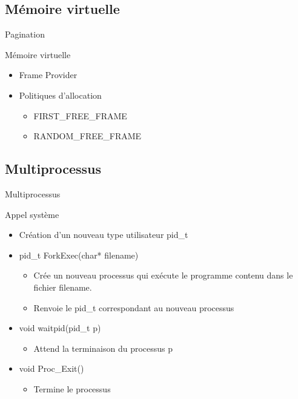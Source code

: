 \documentclass{beamer}
\begin{document}
\subsection{Mémoire virtuelle}
\begin{frame}{Pagination}
	\begin{block}{Mémoire virtuelle}
		\begin{itemize}[<+->]
			\item Frame Provider
			\item Politiques d'allocation
			\begin{itemize}
				\item FIRST\_FREE\_FRAME
				\item RANDOM\_FREE\_FRAME			
			\end{itemize}
		\end{itemize}
	\end{block}
\end{frame}
\subsection{Multiprocessus}

\begin{frame}{Multiprocessus}
	\begin{block}{Appel système}
		\begin{itemize}[<+->]
			\item Création d'un nouveau type utilisateur pid\_t
			\item pid\_t ForkExec(char* filename)
			\begin{itemize}
				\item<1-> Crée un nouveau processus qui exécute le programme contenu dans le fichier filename.
				\item<2-> Renvoie le pid\_t correspondant au nouveau processus
			\end{itemize}
			\item void waitpid(pid\_t p)
			\begin{itemize}
				\item<1-> Attend la terminaison du processus p
			\end{itemize}
			\item void Proc\_Exit()
			\begin{itemize}
				\item<1-> Termine le processus
			\end{itemize}			
		\end{itemize}
	\end{block}
\end{frame}
\end{document}
